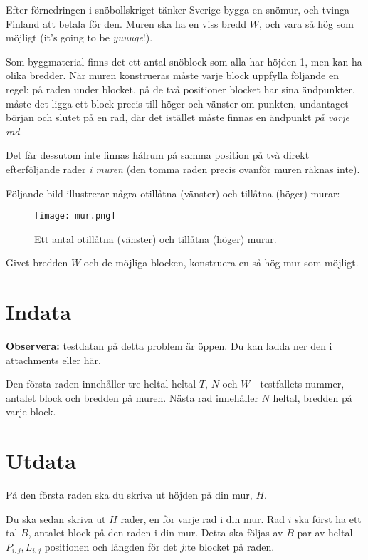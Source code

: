 Efter förnedringen i snöbollskriget tänker Sverige bygga en snömur, och tvinga Finland att betala för den.
Muren ska ha en viss bredd $W$, och vara så hög som möjligt (it's going to be \emph{yuuuge}!).

Som byggmaterial finns det ett antal snöblock som alla har höjden 1, men kan ha olika bredder.
När muren konstrueras måste varje block uppfylla följande en regel: på raden under blocket,
på de två positioner blocket har sina ändpunkter, måste det ligga ett block precis till höger och vänster om punkten,
undantaget början och slutet på en rad, där det istället måste finnas en ändpunkt \emph{på varje rad}.

Det får dessutom inte finnas hålrum på samma position på två direkt efterföljande rader \emph{i muren} (den tomma raden
precis ovanför muren räknas inte).

Följande bild illustrerar några otillåtna (vänster) och tillåtna (höger) murar:

\begin{figure}[h]
	\centering
	\texttt{[image: mur.png]}
	\caption{Ett antal otillåtna (vänster) och tillåtna (höger) murar.}
\end{figure}

Givet bredden $W$ och de möjliga blocken, konstruera en så hög mur som möjligt.

\section*{Indata}
\textbf{Observera:} testdatan på detta problem är öppen. Du kan ladda ner den i attachments eller \href{https://www.progolymp.se/uploads/kattis-attachments/kryssring.zip}{här}.

\noindent
Den första raden innehåller tre heltal heltal $T$, $N$ och $W$ - testfallets nummer, antalet block och bredden på muren.
Nästa rad innehåller $N$ heltal, bredden på varje block.

\section*{Utdata}
På den första raden ska du skriva ut höjden på din mur, $H$.

Du ska sedan skriva ut $H$ rader, en för varje rad i din mur.
Rad $i$ ska först ha ett tal $B$, antalet block på den raden i din mur.
Detta ska följas av $B$ par av heltal $P_{i,j}, L_{i,j}$ positionen och längden för det $j$:te blocket på raden.

